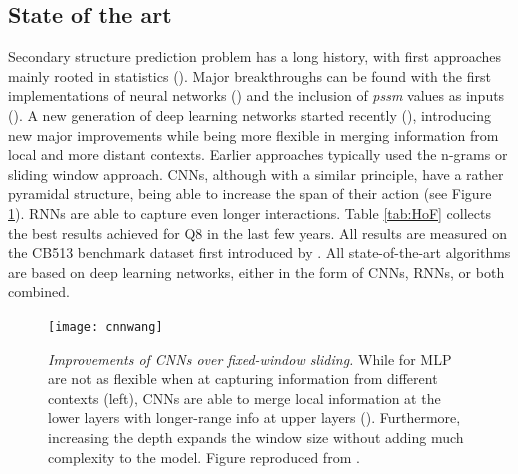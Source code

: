 	\subsection{State of the art}
	Secondary structure prediction problem has a long history, with first approaches mainly rooted in statistics (\cite{Chou1974}). Major breakthroughs can be found with the first implementations of neural networks (\cite{Qian1988}) and the inclusion of \textit{pssm} values as inputs (\cite{Rost1993}). A new generation of deep learning networks started recently (\cite{Zhou2014}), introducing new major improvements while being more flexible in merging information from local and more distant contexts. Earlier approaches typically used the n-grams or sliding window approach. CNNs, although with a similar principle, have a rather pyramidal structure, being able to increase the span of their action (see Figure \ref{fig:cnnwang}). RNNs are able to capture even longer interactions. Table \ref{tab:HoF} collects the best results achieved for Q8 in the last few years. All results are measured on the CB513 benchmark dataset first introduced by \cite{Zhou2014}. All state-of-the-art algorithms are based on deep learning networks, either in the form of CNNs, RNNs, or both combined.
	
	\begin{figure}
		\centering
		\texttt{[image: cnnwang]}
		\caption{\textit{Improvements of CNNs over fixed-window sliding.} While for MLP are not as flexible when at capturing information from different contexts (left), CNNs are able to merge local information at the lower layers with longer-range info at upper layers (\cite{Busia2017}). Furthermore, increasing the depth expands the window size without adding much complexity to the model. Figure reproduced from \cite{Wang2016}.}
		\label{fig:cnnwang}
	\end{figure}
	
